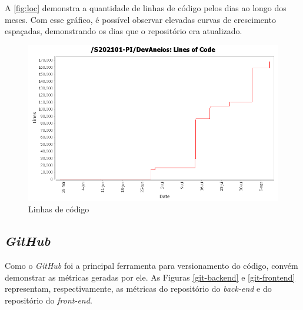 A \autoref{fig:loc} demonstra a quantidade de linhas de código pelos dias ao longo dos meses. Com esse gráfico, é possível observar elevadas curvas de crescimento espaçadas, demonstrando os dias que o repositório era atualizado.

\begin{figure}[htb]
    \centering
	\includegraphics[width=16cm]{imagens/loc.png}
	\caption{\label{fig:loc} Linhas de código}
\end{figure}
\FloatBarrier

\subsection{\textit{GitHub}}
Como o \textit{GitHub} foi a principal ferramenta para versionamento do código, convém demonstrar as métricas geradas por ele. As Figuras \ref{git-backend} e \ref{git-frontend} representam, respectivamente, as métricas do repositório do \textit{\gls{back-end}} e do repositório do \textit{\gls{front-end}}.

